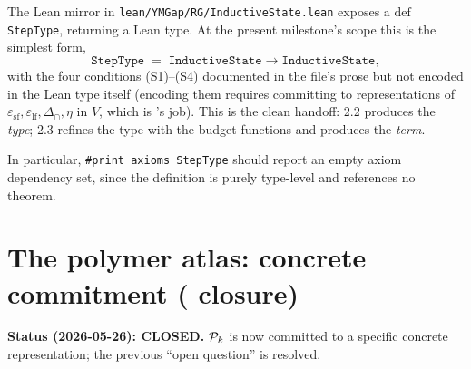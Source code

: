 \begin{remark}
\label{rem:2-2-2-3-handoff}
The Lean mirror in \texttt{lean/YMGap/RG/InductiveState.lean} exposes a $\mathrm{def}$ \texttt{StepType}, returning a Lean type.  At the present milestone's scope this is the simplest form,
\[
  \mathtt{StepType} \;=\; \mathtt{InductiveState} \to \mathtt{InductiveState},
\]
with the four conditions (S1)--(S4) documented in the file's prose but not encoded in the Lean type itself (encoding them requires committing to representations of $\varepsilon_{\mathrm{sf}}, \varepsilon_{\mathrm{lf}}, \Delta_{\cap}, \eta$ in $V$, which is 's job).  This is the clean handoff: 2.2 produces the \emph{type}; 2.3 refines the type with the budget functions and produces the \emph{term}.

In particular, \texttt{\#print axioms StepType} should report an empty axiom dependency set, since the definition is purely type-level and references no theorem.
\end{remark}

\section{The polymer atlas: concrete commitment ( closure)}
\label{sec:open}

\textbf{Status (2026-05-26): CLOSED.}  $\mathcal{P}_k$ is now committed to a
specific concrete representation; the previous ``open question'' is
resolved.

